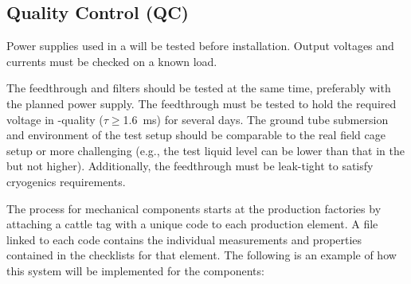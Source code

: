 \subsection{Quality Control (QC)}
\label{sec:fdsp-hv-transport-QC}

Power supplies used in a  will be tested before installation.  Output voltages and currents must be checked on a known load. 

The feedthrough and filters should be tested at the same time, preferably with the planned power supply.  The feedthrough must be tested to hold the required voltage in -quality  ($\tau\geq$\SI{1.6}{ms}) for several days.  The ground tube submersion and \efield{} environment of the test setup should be comparable to the real field cage setup or more challenging (e.g., the test liquid level can be lower than %
that in the  but not higher).  Additionally, the feedthrough must be leak-tight to satisfy cryogenics requirements.

The  process for mechanical components starts at the production factories by attaching a cattle tag with a unique code to each production element.  A file linked to each code contains the individual measurements and properties contained in the  checklists for that element.  The following is an example of how this system will be implemented for the  components:

